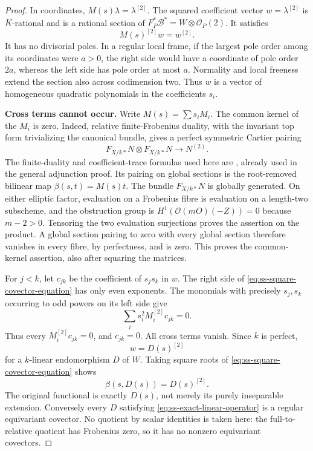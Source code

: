 \begin{proof}
In coordinates, $M(s)\lambda=\lambda^{[2]}$. The squared coefficient
vector $w=\lambda^{[2]}$ is $K$-rational and is a rational section of
$F_P^*\mathcal B^*=W\otimes\mathcal O_P(2)$. It satisfies
\begin{equation}\label{eq:ss-square-covector-equation}
                       M(s)^{[2]}w=w^{[2]}.
\end{equation}
It has no divisorial poles. In a regular local frame, if the largest
pole order among its coordinates were $a>0$, the right side would
have a coordinate of pole order $2a$, whereas the left side has
pole order at most $a$. Normality and local freeness extend the
section also across codimension two. Thus $w$ is a vector of
homogeneous quadratic polynomials in the coefficients $s_i$.

\par\smallskip\noindent\textbf{Cross terms cannot occur.}
Write $M(s)=\sum s_i M_i$. The common kernel of the $M_i$ is zero.
Indeed, relative finite-Frobenius duality, with the invariant top
form trivializing the canonical bundle, gives a perfect symmetric
Cartier pairing
\begin{equation}\label{eq:ss-perfect-Cartier-pairing}
 F_{X/k*}N\otimes F_{X/k*}N\longrightarrow N^{(2)}.
\end{equation}
The finite-duality and coefficient-trace formulas used here are
\cite[Lemma~1.3.6, Proposition~1.3.7, Theorem~1.3.8, pp.~26--28]
{BrionKumar2005}, already used in the general adjunction proof.
Its pairing on global sections is the root-removed bilinear map
$\beta(s,t)=M(s)t$. The bundle $F_{X/k*}N$ is globally generated.
On either elliptic factor, evaluation on a Frobenius fibre is
evaluation on a length-two subscheme, and the obstruction group is
$H^1(\mathcal O(mO)(-Z))=0$ because $m-2>0$.
Tensoring the two evaluation surjections proves the assertion on
the product. A global section pairing to zero with every global
section therefore vanishes in every fibre, by perfectness, and
is zero. This proves the common-kernel assertion, also after
squaring the matrices.

For $j<k$, let $c_{jk}$ be the coefficient of $s_js_k$ in $w$.
The right side of \eqref{eq:ss-square-covector-equation} has only
even exponents. The monomials with precisely $s_j,s_k$ occurring
to odd powers on its left side give
\[
              \sum_i s_i^2M_i^{[2]}c_{jk}=0.
\]
Thus every $M_i^{[2]}c_{jk}=0$, and $c_{jk}=0$.
All cross terms vanish. Since $k$ is perfect,
\[
                         w=D(s)^{[2]}
\]
for a $k$-linear endomorphism $D$ of $W$. Taking square roots of
\eqref{eq:ss-square-covector-equation} shows
\begin{equation}\label{eq:ss-exact-linear-operator}
                 \beta(s,D(s))=D(s)^{[2]}.
\end{equation}
The original functional is exactly $D(s)$, not merely its
purely inseparable extension. Conversely every $D$ satisfying
\eqref{eq:ss-exact-linear-operator} is a regular equivariant
covector. No quotient by scalar identities is taken here:
the full-to-relative quotient has Frobenius zero, so it has no
nonzero equivariant covectors.


\end{proof}
